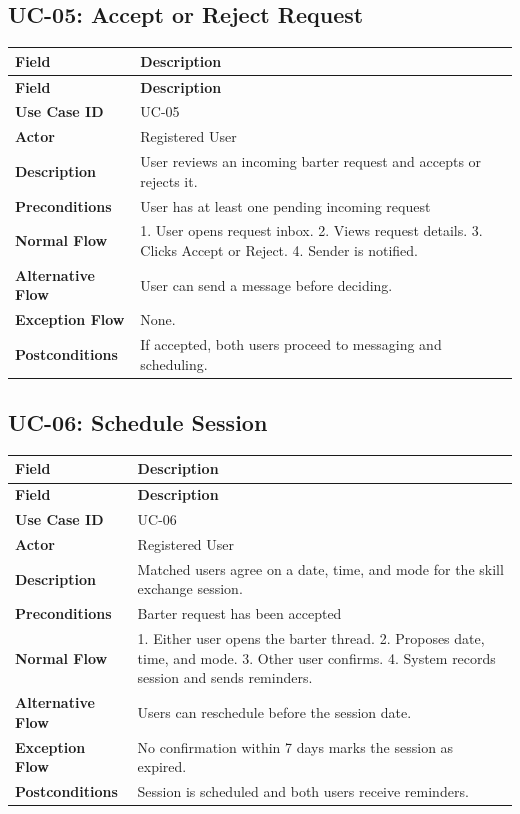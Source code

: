 \documentclass[12pt,a4paper]{article}
\begin{document}
\subsection*{UC-05: Accept or Reject Request}
\begin{longtable}{>{\bfseries}L{3.5cm} L{10cm}}
\toprule
\textbf{Field} & \textbf{Description} \\ \midrule \endfirsthead \midrule \textbf{Field} & \textbf{Description} \\ \midrule \endhead \bottomrule \endfoot
Use Case ID      & UC-05 \\
Actor            & Registered User \\
Description      & User reviews an incoming barter request and accepts or rejects it. \\
Preconditions    & User has at least one pending incoming request \\
Normal Flow      & 1. User opens request inbox. 2. Views request details. 3. Clicks Accept or Reject. 4. Sender is notified. \\
Alternative Flow & User can send a message before deciding. \\
Exception Flow   & None. \\
Postconditions   & If accepted, both users proceed to messaging and scheduling. \\
\end{longtable}

\subsection*{UC-06: Schedule Session}
\begin{longtable}{>{\bfseries}L{3.5cm} L{10cm}}
\toprule
\textbf{Field} & \textbf{Description} \\ \midrule \endfirsthead \midrule \textbf{Field} & \textbf{Description} \\ \midrule \endhead \bottomrule \endfoot
Use Case ID      & UC-06 \\
Actor            & Registered User \\
Description      & Matched users agree on a date, time, and mode for the skill exchange session. \\
Preconditions    & Barter request has been accepted \\
Normal Flow      & 1. Either user opens the barter thread. 2. Proposes date, time, and mode. 3. Other user confirms. 4. System records session and sends reminders. \\
Alternative Flow & Users can reschedule before the session date. \\
Exception Flow   & No confirmation within 7 days marks the session as expired. \\
Postconditions   & Session is scheduled and both users receive reminders. \\
\end{longtable}
\end{document}
